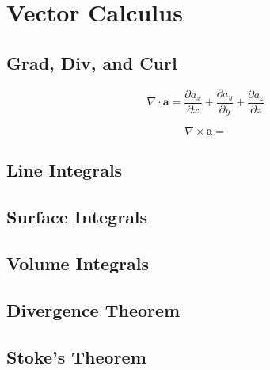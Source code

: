 \chapter{Vector Calculus}

\section{Grad, Div, and Curl}

\begin{equation*}
    \nabla \cdot \boldsymbol{a} = \frac{\partial a_{x}}{\partial x} + \frac{\partial a_{y}}{\partial y} + \frac{\partial a_{z}}{\partial z} 
\end{equation*}

\begin{equation*}
    \nabla \times \boldsymbol{a} = 
\end{equation*}

\section{Line Integrals}

\section{Surface Integrals}

\section{Volume Integrals}

\section{Divergence Theorem}

\section{Stoke's Theorem}